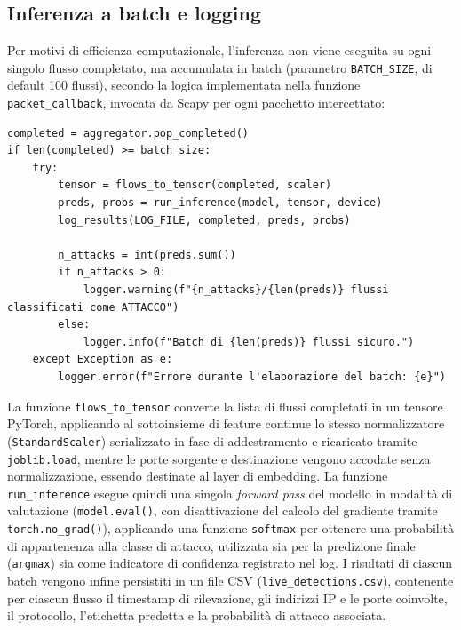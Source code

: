 \documentclass[12pt,a4paper]{report}
\begin{document}
\subsection{Inferenza a batch e logging}

Per motivi di efficienza computazionale, l'inferenza non viene eseguita su ogni singolo flusso completato, ma accumulata in batch (parametro \texttt{BATCH\_SIZE}, di default 100 flussi), secondo la logica implementata nella funzione \texttt{packet\_callback}, invocata da Scapy per ogni pacchetto intercettato:

\begin{lstlisting}[caption={Trigger dell'inferenza a batch e logging dei risultati (\texttt{ACDBliveScript.py})}]
completed = aggregator.pop_completed()
if len(completed) >= batch_size:
    try:
        tensor = flows_to_tensor(completed, scaler)
        preds, probs = run_inference(model, tensor, device)
        log_results(LOG_FILE, completed, preds, probs)

        n_attacks = int(preds.sum())
        if n_attacks > 0:
            logger.warning(f"{n_attacks}/{len(preds)} flussi classificati come ATTACCO")
        else:
            logger.info(f"Batch di {len(preds)} flussi sicuro.")
    except Exception as e:
        logger.error(f"Errore durante l'elaborazione del batch: {e}")
\end{lstlisting}

La funzione \texttt{flows\_to\_tensor} converte la lista di flussi completati in un tensore PyTorch, applicando al sottoinsieme di feature continue lo stesso normalizzatore (\texttt{StandardScaler}) serializzato in fase di addestramento e ricaricato tramite \texttt{joblib.load}, mentre le porte sorgente e destinazione vengono accodate senza normalizzazione, essendo destinate al layer di embedding. La funzione \texttt{run\_inference} esegue quindi una singola \emph{forward pass} del modello in modalità di valutazione (\texttt{model.eval()}, con disattivazione del calcolo del gradiente tramite \texttt{torch.no\_grad()}), applicando una funzione \texttt{softmax} per ottenere una probabilità di appartenenza alla classe di attacco, utilizzata sia per la predizione finale (\texttt{argmax}) sia come indicatore di confidenza registrato nel log. I risultati di ciascun batch vengono infine persistiti in un file CSV (\texttt{live\_detections.csv}), contenente per ciascun flusso il timestamp di rilevazione, gli indirizzi IP e le porte coinvolte, il protocollo, l'etichetta predetta e la probabilità di attacco associata.
\end{document}
